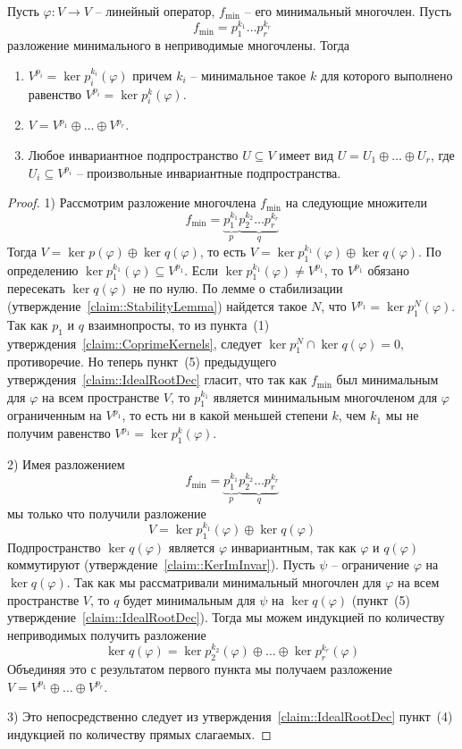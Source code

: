 \begin{claim}
\label{claim::GenRootDec}
Пусть $\varphi\colon V\to V$ -- линейный оператор, $f_\text{min}$ -- его минимальный многочлен.
Пусть
\[
f_\text{min} = p_1^{k_1} \ldots p_r^{k_r}
\]
разложение минимального в неприводимые многочлены.
Тогда
\begin{enumerate}
\item  $V^{p_i} = \ker p_i^{k_i}(\varphi)$ причем $k_i$ -- минимальное такое $k$ для которого выполнено равенство $V^{p_i} = \ker p_i^{k}(\varphi)$.

\item $V = V^{p_1}\oplus \ldots \oplus V^{p_r}$.

\item Любое инвариантное подпространство $U\subseteq V$ имеет вид $U = U_1\oplus \ldots \oplus U_r$, где $U_i \subseteq V^{p_i}$ -- произвольные инвариантные подпространства.
\end{enumerate}
\end{claim}
\begin{proof}
1) Рассмотрим разложение многочлена $f_\text{min}$ на следующие множители
\[
f_\text{min} = \underbrace{p_1^{k_1}}_{p}\underbrace{p_2^{k_2}\ldots p_r^{k_r}}_{q}
\]
Тогда $V = \ker p(\varphi) \oplus \ker q(\varphi)$, то есть
$V = \ker p_1^{k_1}(\varphi) \oplus \ker q(\varphi)$.
По определению $\ker p_1^{k_1}(\varphi) \subseteq V^{p_1}$.
Если $\ker p_1^{k_1}(\varphi) \neq V^{p_1}$, то $V^{p_1}$ обязано пересекать $\ker q(\varphi)$ не по нулю.
По лемме о стабилизации (утверждение~\ref{claim::StabilityLemma}) найдется такое $N$, что $V^{p_1} = \ker p_1^{N}(\varphi)$.
Так как $p_1$ и $q$ взаимнопросты, то из пункта~(1) утверждения~\ref{claim::CoprimeKernels}, следует $\ker p_1^{N}\cap \ker q(\varphi) = 0$, противоречие.
Но теперь пункт~(5) предыдущего утверждения~\ref{claim::IdealRootDec} гласит, что так как $f_\text{min}$ был минимальным для $\varphi$ на всем пространстве $V$, то $p_1^{k_1}$ является минимальным многочленом для $\varphi$ ограниченным на $V^{p_1}$, то есть ни в какой меньшей степени $k$, чем $k_1$ мы не получим равенство $V^{p_1} = \ker p_1^k(\varphi)$.


2) Имея разложением
\[
f_\text{min} = \underbrace{p_1^{k_1}}_{p}\underbrace{p_2^{k_2}\ldots p_r^{k_r}}_{q}
\]
мы только что получили разложение
\[
V = \ker p_1^{k_1}(\varphi) \oplus \ker q(\varphi)
\]
Подпространство $\ker q(\varphi)$ является $\varphi$ инвариантным, так как $\varphi$ и $q(\varphi)$ коммутируют (утверждение~\ref{claim::KerImInvar}).
Пусть $\psi$ -- ограничение $\varphi$ на $\ker q(\varphi)$.
Так как мы рассматривали минимальный многочлен для $\varphi$ на всем пространстве $V$, то $q$ будет минимальным для $\psi$ на $\ker q(\varphi)$ (пункт~(5) утверждение~\ref{claim::IdealRootDec}).
Тогда мы можем индукцией по количеству неприводимых получить разложение
\[
\ker q(\varphi) = \ker p_2^{k_2}(\varphi) \oplus \ldots \oplus \ker p_r^{k_r}(\varphi)
\]
Объединяя это с результатом первого пункта мы получаем разложение $V = V^{p_1}\oplus \ldots \oplus V^{p_r}$.

3) Это непосредственно следует из утверждения~\ref{claim::IdealRootDec} пункт~(4) индукцией по количеству прямых слагаемых.
\end{proof}
